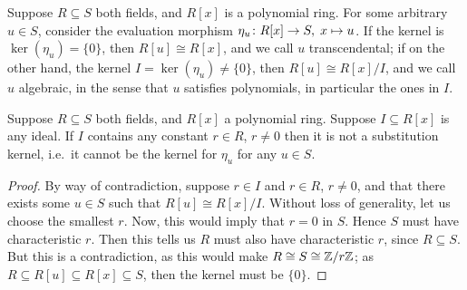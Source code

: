 \begin{definition}
    Suppose \(R \subseteq S\) both fields,
    and \(R[x]\) is a polynomial ring.
    For some arbitrary \(u \in S\),
    consider the evaluation morphism \(\eta_u\colon R[x]\to S,\;x\mapsto u\).
    If the kernel is \(\ker(\eta_u) = \{0\}\),
    then \(R[u] \cong R[x]\), and we call \(u\) transcendental;
    if on the other hand, the kernel \(I = \ker(\eta_u) \neq \{0\}\),
    then \(R[u] \cong R[x]/I\), and we call \(u\) algebraic,
    in the sense that \(u\) satisfies polynomials,
    in particular the ones in \(I\).
\end{definition}

\begin{theorem}
    Suppose \(R \subseteq S\) both fields,
    and \(R[x]\) a polynomial ring.
    Suppose \(I \subseteq R[x]\) is any ideal.
    If \(I\) contains any constant \(r \in R\), \(r \neq 0\)
    then it is not a substitution kernel,
    i.e.\ it cannot be the kernel for \(\eta_u\) for any \(u \in S\).
\end{theorem}
\begin{proof}
    By way of contradiction, suppose \(r \in I\) and \(r \in R\), \(r \neq 0\),
    and that there exists some \(u \in S\)
    such that \(R[u] \cong R[x]/I\).
    Without loss of generality, let us choose the smallest \(r\).
    Now, this would imply that \(r = 0\) in \(S\).
    Hence \(S\) must have characteristic \(r\).
    Then this tells us \(R\) must also have characteristic \(r\),
    since \(R \subseteq S\).
    But this is a contradiction,
    as this would make \(R \cong S \cong \mathbb{Z}/r\mathbb{Z}\);
    as \(R \subseteq R[u] \subseteq R[x] \subseteq S\),
    then the kernel must be \(\{0\}\).
\end{proof}

